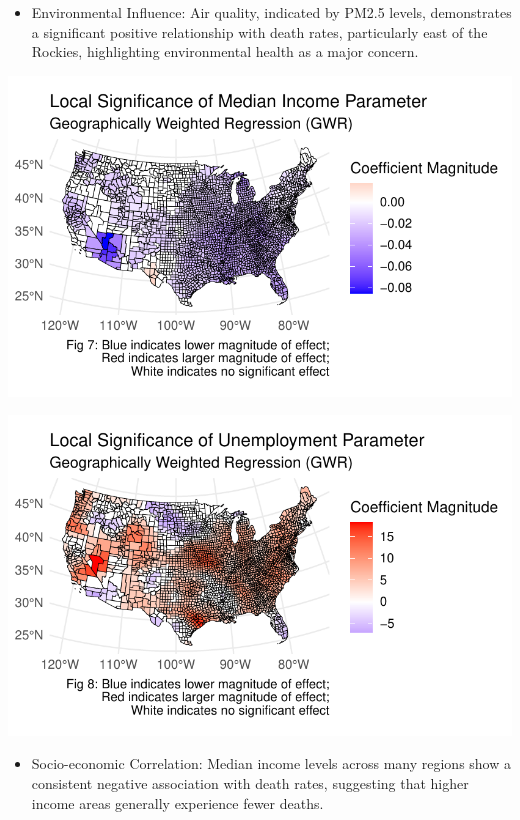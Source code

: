 \documentclass[
]{article}
\providecommand{\tightlist}{%
  \setlength{\itemsep}{0pt}\setlength{\parskip}{0pt}}\usepackage{longtable,booktabs,array}
\begin{document}
\begin{itemize}
\tightlist
\item
  Environmental Influence: Air quality, indicated by PM2.5 levels,
  demonstrates a significant positive relationship with death rates,
  particularly east of the Rockies, highlighting environmental health as
  a major concern.
\end{itemize}

\includegraphics{report_files/figure-pdf/unnamed-chunk-6-1.pdf}

\includegraphics{report_files/figure-pdf/unnamed-chunk-6-2.pdf}

\begin{itemize}
\tightlist
\item
  Socio-economic Correlation: Median income levels across many regions
  show a consistent negative association with death rates, suggesting
  that higher income areas generally experience fewer deaths.
\end{itemize}
\end{document}
